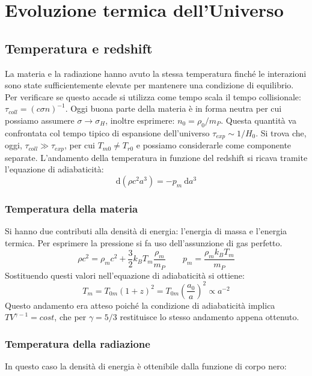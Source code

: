 \chapter{Evoluzione termica dell'Universo}\label{3:ch}


\section{Temperatura e redshift}
La materia e la radiazione hanno avuto la stessa temperatura finché le interazioni sono state sufficientemente elevate per mantenere una condizione di equilibrio. Per verificare se questo accade si utilizza come tempo scala il tempo collisionale: $\tau_{coll}=(c\sigma n)^{-1}$. Oggi buona parte della materia è in forma neutra per cui possiamo assumere $\sigma \rightarrow \sigma_H$, inoltre  esprimere: $n_0 = \rho_0 / m_P$. Questa quantità va confrontata col tempo tipico di espansione dell'universo $\tau_{exp} \sim 1/H_0$. Si trova che, oggi, $\tau_{coll} \gg \tau_{exp}$, per cui $T_{m0} \neq T_{r0}$ e possiamo considerarle come componente separate.
L'andamento della temperatura in funzione del redshift si ricava tramite l'equazione di adiabaticità:
$$
\mathrm{d}(\rho c^2 a^3) = - p_m\: \mathrm{d}a^3
$$




\subsection{Temperatura della materia}
Si hanno due contributi alla densità di energia: l'energia di massa e l'energia termica. Per esprimere la pressione si fa uso dell'assunzione di gas perfetto. 
$$
 \rho c^2 = \rho_m c^2 + \frac{3}{2}k_B T_m \frac{\rho_m}{m_P} \qquad p_m = \frac{\rho_m k_B T_m}{m_P}
$$
Sostituendo questi valori nell'equazione di adiabaticità si ottiene:
\begin{equation}
    T_m = T_{0m} (1+z)^2 = T_{0m}\left ( \frac{a_0}{a}\right )^2  \propto a^{-2}
\end{equation}
Questo andamento era atteso poiché la condizione di adiabaticità implica $TV^{\gamma -1} = cost$, che per $\gamma=5/3$ restituisce lo stesso andamento appena ottenuto.

\subsection{Temperatura della radiazione}
In questo caso la densità di energia è ottenibile dalla funzione di corpo nero:

